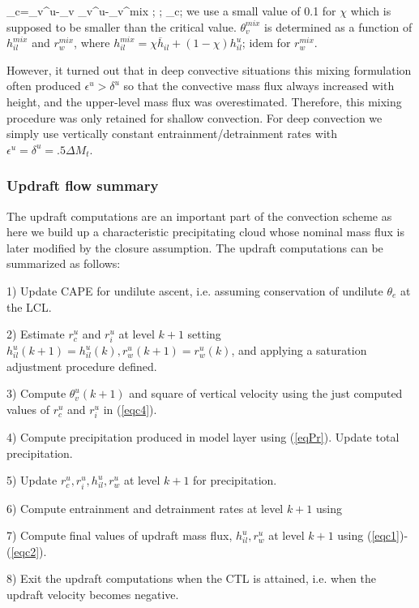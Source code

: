 \beq
\chi_c={\theta_v^u-\overline{\theta}_v\over
         {\theta}_v^u-\theta_v^{mix} }   \chi; \quad {};
         \le\chi_c;
\label{eqx5}
\eeq
\noindent
we use a small value of 0.1 for $\chi$ which is
supposed to be smaller than the critical value. $\theta_v^{mix}$ is
determined as a function of $h_{il}^{mix}$ and $r_w^{mix}$, where
$h_{il}^{mix}=\chi \overline{h}_{il}+(1-\chi)h_{il}^u$; idem for $r_w^{mix}$.

However, it turned out that in deep convective situations this mixing formulation often 
 produced $\epsilon^u>\delta^u$ so that the convective mass flux always increased with height,
and the upper-level mass flux was overestimated.
 Therefore, this mixing procedure was only retained for shallow convection. For deep convection
we simply use vertically constant entrainment/detrainment rates with 
 $\epsilon^u=\delta^u=.5 \Delta M_t$.



\subsubsection {Updraft flow summary}

The updraft computations are an important
part of the convection scheme as here we build up a characteristic
precipitating cloud whose nominal mass flux is later modified
by the closure assumption. The
updraft computations can be summarized as follows:

1) Update CAPE for undilute ascent, i.e. assuming conservation of undilute
 $\theta_e$  at the LCL.

2) Estimate $r_c^u$ and $r_i^u$ at level $k+1$ setting
$h_{il}^u(k+1)=h_{il}^u(k), r_w^u(k+1)=r_w^u(k)$, and applying a
saturation adjustment procedure defined.

3) Compute $\theta_v^u(k+1)$ and square of vertical velocity using the
just computed values of $r_c^u$ and $r_i^u$ in (\ref{eqc4}).

4) Compute precipitation produced in model layer using (\ref{eqPr}).
Update total precipitation.

5) Update $r_c^u, r_i^u, h_{il}^u, r_w^u$ at level $k+1$
for precipitation.

6) Compute entrainment and detrainment rates at level $k+1$ using

7) Compute final values of updraft mass flux, $h_{il}^u, r_w^u$
at level $k+1$ using (\ref{eqc1})-(\ref{eqc2}).

8) Exit the updraft computations when the CTL is attained, i.e. when
the updraft velocity becomes negative.

